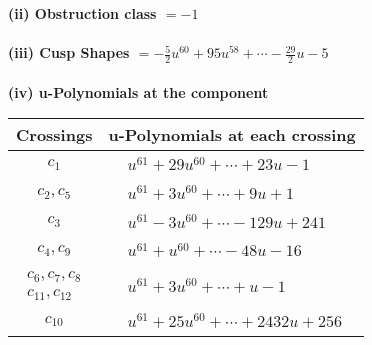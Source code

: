 \documentclass[1p]{elsarticle_modified}
\theoremstyle{definition}
\begin{document}
\flushleft \textbf{(ii) Obstruction class $= -1$}\\~\\
\flushleft \textbf{(iii) Cusp Shapes $= -\frac{5}{2} u^{60}+95 u^{58}+\cdots-\frac{29}{2} u-5$}\\~\\
\newpage\renewcommand{\arraystretch}{1}
\flushleft \textbf{(iv) u-Polynomials at the component}\newline \\
\begin{tabular}{m{50pt}|m{274pt}}
Crossings & \hspace{64pt}u-Polynomials at each crossing \\
\hline $$\begin{aligned}c_{1}\end{aligned}$$&$\begin{aligned}
&u^{61}+29 u^{60}+\cdots+23 u-1
\end{aligned}$\\
\hline $$\begin{aligned}c_{2},c_{5}\end{aligned}$$&$\begin{aligned}
&u^{61}+3 u^{60}+\cdots+9 u+1
\end{aligned}$\\
\hline $$\begin{aligned}c_{3}\end{aligned}$$&$\begin{aligned}
&u^{61}-3 u^{60}+\cdots-129 u+241
\end{aligned}$\\
\hline $$\begin{aligned}c_{4},c_{9}\end{aligned}$$&$\begin{aligned}
&u^{61}+u^{60}+\cdots-48 u-16
\end{aligned}$\\
\hline $$\begin{aligned}c_{6},c_{7},c_{8}\\c_{11},c_{12}\end{aligned}$$&$\begin{aligned}
&u^{61}+3 u^{60}+\cdots+u-1
\end{aligned}$\\
\hline $$\begin{aligned}c_{10}\end{aligned}$$&$\begin{aligned}
&u^{61}+25 u^{60}+\cdots+2432 u+256
\end{aligned}$\\
\hline
\end{tabular}\\~\\
\end{document}
